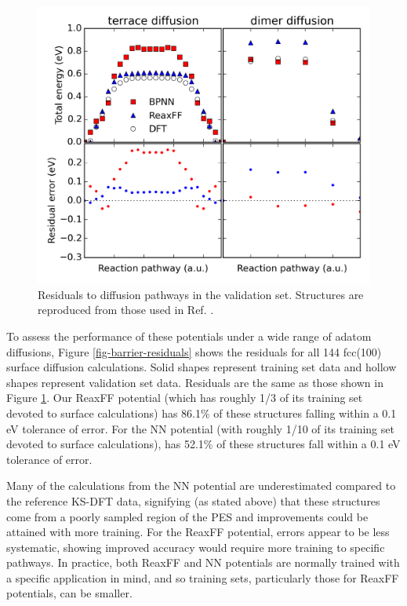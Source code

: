 \documentclass[12pt]{cmuthesis}
\begin{document}
\begin{figure}[h]
\centering
\includegraphics[width=5in]{./images/fig-full-diffusion.png}
\caption{\label{fig-full-diffusion}
Residuals to diffusion pathways in the validation set. Structures are reproduced from those used in Ref. .}
\end{figure}

To assess the performance of these potentials under a wide range of adatom diffusions, Figure \ref{fig-barrier-residuals} shows the residuals for all 144 fcc(100) surface diffusion calculations. Solid shapes represent training set data and hollow shapes represent validation set data. Residuals are the same as those shown in Figure \ref{fig-full-diffusion}. Our ReaxFF potential (which has roughly 1/3 of its training set devoted to surface calculations) has 86.1\% of these structures falling within a \textpm{} 0.1 eV tolerance of error. For the NN potential (with roughly 1/10 of its training set devoted to surface calculations), has 52.1\% of these structures fall within a \textpm{} 0.1 eV tolerance of error.

Many of the calculations from the NN potential are underestimated compared to the reference KS-DFT data, signifying (as stated above) that these structures come from a poorly sampled region of the PES and improvements could be attained with more training. For the ReaxFF potential, errors appear to be less systematic, showing improved accuracy would require more training to specific pathways. In practice, both ReaxFF and NN potentials are normally trained with a specific application in mind, and so training sets, particularly those for ReaxFF potentials, can be smaller.
\end{document}
